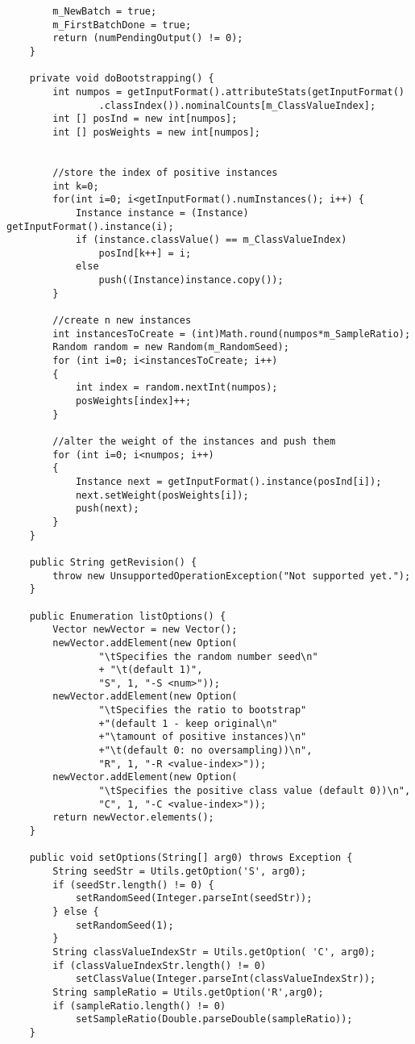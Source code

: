 \begin{lstlisting}
        m_NewBatch = true;
        m_FirstBatchDone = true;
        return (numPendingOutput() != 0);
    }

    private void doBootstrapping() {
        int numpos = getInputFormat().attributeStats(getInputFormat()
                .classIndex()).nominalCounts[m_ClassValueIndex];
        int [] posInd = new int[numpos];
        int [] posWeights = new int[numpos];


        //store the index of positive instances
        int k=0;
        for(int i=0; i<getInputFormat().numInstances(); i++) {
            Instance instance = (Instance) getInputFormat().instance(i);
            if (instance.classValue() == m_ClassValueIndex)
                posInd[k++] = i;
            else
                push((Instance)instance.copy());
        }

        //create n new instances
        int instancesToCreate = (int)Math.round(numpos*m_SampleRatio);
        Random random = new Random(m_RandomSeed);
        for (int i=0; i<instancesToCreate; i++)
        {
            int index = random.nextInt(numpos);
            posWeights[index]++;
        }

        //alter the weight of the instances and push them
        for (int i=0; i<numpos; i++)
        {
            Instance next = getInputFormat().instance(posInd[i]);
            next.setWeight(posWeights[i]);
            push(next);
        }
    }

    public String getRevision() {
        throw new UnsupportedOperationException("Not supported yet.");
    }

    public Enumeration listOptions() {
        Vector newVector = new Vector();
        newVector.addElement(new Option(
                "\tSpecifies the random number seed\n"
                + "\t(default 1)",
                "S", 1, "-S <num>"));
        newVector.addElement(new Option(
                "\tSpecifies the ratio to bootstrap"
                +"(default 1 - keep original\n"
                +"\tamount of positive instances)\n"
                +"\t(default 0: no oversampling))\n",
                "R", 1, "-R <value-index>"));
        newVector.addElement(new Option(
                "\tSpecifies the positive class value (default 0))\n",
                "C", 1, "-C <value-index>"));
        return newVector.elements();
    }

    public void setOptions(String[] arg0) throws Exception {
        String seedStr = Utils.getOption('S', arg0);
        if (seedStr.length() != 0) {
            setRandomSeed(Integer.parseInt(seedStr));
        } else {
            setRandomSeed(1);
        }
        String classValueIndexStr = Utils.getOption( 'C', arg0);
        if (classValueIndexStr.length() != 0)
            setClassValue(Integer.parseInt(classValueIndexStr));
        String sampleRatio = Utils.getOption('R',arg0);
        if (sampleRatio.length() != 0)
            setSampleRatio(Double.parseDouble(sampleRatio));
    }


\end{lstlisting}
